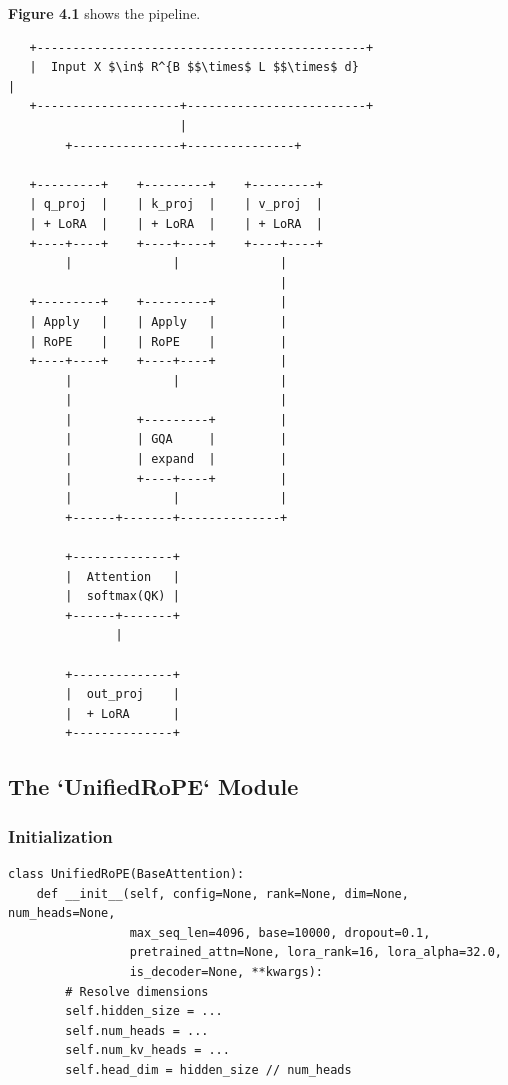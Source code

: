 {\begin{enumerate}
\end{enumerate}
\textbf{Figure 4.1} shows the pipeline.

\begin{lstlisting}
   +----------------------------------------------+
   |  Input X $\in$ R^{B $$\times$ L $$\times$ d}                     |
   +--------------------+-------------------------+
                        |
        +---------------+---------------+
                                         
   +---------+    +---------+    +---------+
   | q_proj  |    | k_proj  |    | v_proj  |
   | + LoRA  |    | + LoRA  |    | + LoRA  |
   +----+----+    +----+----+    +----+----+
        |              |              |
                                      |
   +---------+    +---------+         |
   | Apply   |    | Apply   |         |
   | RoPE    |    | RoPE    |         |
   +----+----+    +----+----+         |
        |              |              |
        |                             |
        |         +---------+         |
        |         | GQA     |         |
        |         | expand  |         |
        |         +----+----+         |
        |              |              |
        +------+-------+--------------+
                
        +--------------+
        |  Attention   |
        |  softmax(QK) |
        +------+-------+
               |
                
        +--------------+
        |  out_proj    |
        |  + LoRA      |
        +--------------+
\end{lstlisting}

\subsection{The `UnifiedRoPE` Module}

\subsubsection{Initialization}

\begin{lstlisting}
class UnifiedRoPE(BaseAttention):
    def __init__(self, config=None, rank=None, dim=None, num_heads=None,
                 max_seq_len=4096, base=10000, dropout=0.1,
                 pretrained_attn=None, lora_rank=16, lora_alpha=32.0,
                 is_decoder=None, **kwargs):
        # Resolve dimensions
        self.hidden_size = ...
        self.num_heads = ...
        self.num_kv_heads = ...
        self.head_dim = hidden_size // num_heads
        

\end{lstlisting}}
